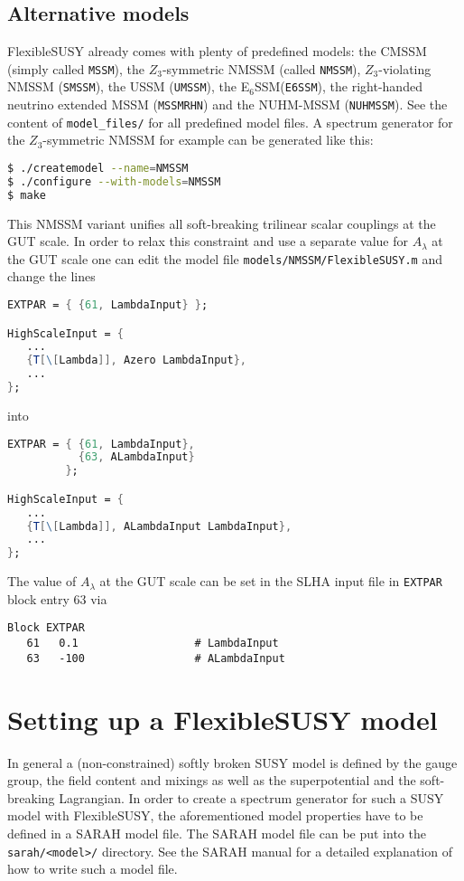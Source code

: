 \documentclass[final,3p,11pt,pdflatex]{elsarticle}
\makeatletter
\newcommand{\fs}{FlexibleSUSY\@\xspace}
\newcommand{\ESSM}{E$_6$SSM\@\xspace}
\newcommand{\code}[1]{\lstinline|#1|}  %
\makeatother
\begin{document}
\subsection{Alternative models}

\fs already comes with plenty of predefined models: the CMSSM (simply
called \code{MSSM}), the $Z_3$-symmetric NMSSM (called \code{NMSSM}),
$Z_3$-violating NMSSM (\code{SMSSM}), the USSM (\code{UMSSM}), the
\ESSM (\code{E6SSM}), the right-handed neutrino extended MSSM
(\code{MSSMRHN}) and the NUHM-MSSM (\code{NUHMSSM}).  See the content
of \code{model_files/} for all predefined model files.  A spectrum
generator for the $Z_3$-symmetric NMSSM for example can be generated
like this:
%
\begin{lstlisting}[language=bash]
$ ./createmodel --name=NMSSM
$ ./configure --with-models=NMSSM
$ make
\end{lstlisting}%
%
This NMSSM variant unifies all soft-breaking trilinear scalar
couplings at the GUT scale.  In order to relax this constraint and use
a separate value for $A_\lambda$ at the GUT scale one can edit the
model file \code{models/NMSSM/FlexibleSUSY.m} and change the lines
%
\begin{lstlisting}[language=Mathematica]
EXTPAR = { {61, LambdaInput} };

HighScaleInput = {
   ...
   {T[\[Lambda]], Azero LambdaInput},
   ...
};
\end{lstlisting}
%
into
%
\begin{lstlisting}[language=Mathematica]
EXTPAR = { {61, LambdaInput},
           {63, ALambdaInput}
         };

HighScaleInput = {
   ...
   {T[\[Lambda]], ALambdaInput LambdaInput},
   ...
};
\end{lstlisting}
%
The value of $A_\lambda$ at the GUT scale can be set in the SLHA input
file in \code{EXTPAR} block entry $63$ via
%
\begin{lstlisting}
Block EXTPAR
   61   0.1                  # LambdaInput
   63   -100                 # ALambdaInput
\end{lstlisting}

\section{Setting up a FlexibleSUSY model}
\label{Sec:modfile}

In general a (non-constrained) softly broken SUSY model is defined by
the gauge group, the field content and mixings as well as the
superpotential and the soft-breaking Lagrangian.  In order to create a
spectrum generator for such a SUSY model with \fs, the aforementioned
model properties have to be defined in a SARAH model file.  The SARAH
model file can be put into the \code{sarah/<model>/} directory.  See
the SARAH manual \cite{Staub:2008uz,Staub:2013tta} for a detailed
explanation of how to write such a model file.
\end{document}
